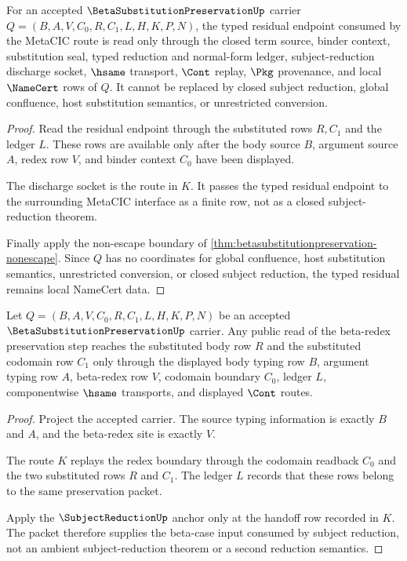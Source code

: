 \begin{theorem}
\label{thm:beta-substitution-preservation-typed-residual-nonescape}
For an accepted $\BetaSubstitutionPreservationUp$ carrier $Q=(B,A,V,C_0,R,C_1,L,H,K,P,N)$, the typed residual endpoint consumed by the MetaCIC route is read only through the closed term source, binder context, substitution seal, typed reduction and normal-form ledger, subject-reduction discharge socket, $\hsame$ transport, $\Cont$ replay, $\Pkg$ provenance, and local $\NameCert$ rows of $Q$. It cannot be replaced by closed subject reduction, global confluence, host substitution semantics, or unrestricted conversion.
\end{theorem}
\begin{proof}
Read the residual endpoint through the substituted rows $R,C_1$ and the ledger $L$. These rows are available only after the body source $B$, argument source $A$, redex row $V$, and binder context $C_0$ have been displayed.

The discharge socket is the route in $K$. It passes the typed residual endpoint to the surrounding MetaCIC interface as a finite row, not as a closed subject-reduction theorem.

Finally apply the non-escape boundary of \autoref{thm:betasubstitutionpreservation-nonescape}. Since $Q$ has no coordinates for global confluence, host substitution semantics, unrestricted conversion, or closed subject reduction, the typed residual remains local NameCert data.
\end{proof}

\begin{theorem}
\label{thm:betasubstitutionpreservation-redex-closure}
Let $Q=(B,A,V,C_0,R,C_1,L,H,K,P,N)$ be an accepted $\BetaSubstitutionPreservationUp$ carrier. Any public read of the beta-redex preservation step reaches the substituted body row $R$ and the substituted codomain row $C_1$ only through the displayed body typing row $B$, argument typing row $A$, beta-redex row $V$, codomain boundary $C_0$, ledger $L$, componentwise $\hsame$ transports, and displayed $\Cont$ routes.
\end{theorem}
\begin{proof}
Project the accepted carrier. The source typing information is exactly $B$ and $A$, and the beta-redex site is exactly $V$.

The route $K$ replays the redex boundary through the codomain readback $C_0$ and the two substituted rows $R$ and $C_1$. The ledger $L$ records that these rows belong to the same preservation packet.

Apply the $\SubjectReductionUp$ anchor only at the handoff row recorded in $K$. The packet therefore supplies the beta-case input consumed by subject reduction, not an ambient subject-reduction theorem or a second reduction semantics.
\end{proof}

